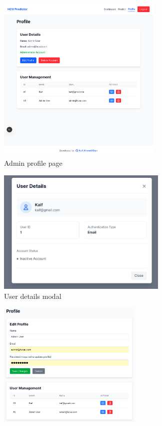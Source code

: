 \begin{figure}[htbp]
  \begin{subfigure}{0.5\textwidth}
    \includegraphics[width=0.9\linewidth, height=8cm]{figures/site/admin-profile.png} 
    \caption{Admin profile page}
    \label{fig:profile}
  \end{subfigure}
  \begin{subfigure}{0.5\textwidth}
    \includegraphics[width=0.9\linewidth, height=6cm]{figures/site/user-details.png}
    \caption{User details modal}
    \label{fig:userdetails}
  \end{subfigure}
  \begin{subfigure}{0.5\textwidth}
    \includegraphics[width=0.9\linewidth, height=6cm]{figures/site/edit-profile.png}

\end{subfigure}
\end{figure}
